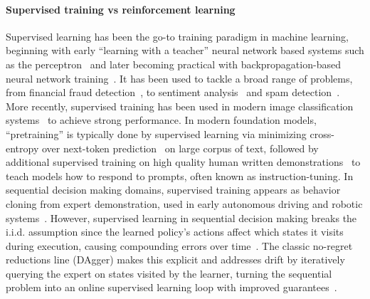 \documentclass[10pt]{article} %
\begin{document}
\paragraph{Supervised training vs reinforcement learning} Supervised learning has been the go-to training paradigm in machine learning, beginning with early ``learning with a teacher'' neural network based systems such as the perceptron~\citep{Rosenblatt1958ThePA} and later becoming practical with backpropagation-based neural network training~\citep{rumelhart1986learning}. It has been used to tackle a broad range of problems, from financial fraud detection~\citep{AFRIYIE2023100163,Editya_Alamin_Pramana_Kurniati_2025}, to sentiment analysis~\citep{zhang2018deeplearningsentimentanalysis} and spam detection~\citep{smsspamclassification,imagespamdetection}. More recently, supervised training has been used in modern image classification systems~\citep{lenet,alexnet} to achieve strong performance. In modern foundation models, ``pretraining'' is typically done by supervised learning via minimizing cross-entropy over next-token prediction~\citep{radford2018improving,radford2019language} on large corpus of text, followed by additional supervised training on high quality human written demonstrations~\citep{ouyang2022traininglanguagemodelsfollow,zhang2025instructiontuninglargelanguage} to teach models how to respond to prompts, often known as instruction-tuning. In sequential decision making domains, supervised training appears as behavior cloning from expert demonstration, used in early autonomous driving and robotic systems~\citep{alvinn,bojarski2016endendlearningselfdriving,codevilla2018endtoenddrivingconditionalimitation}. However, supervised learning in sequential decision making breaks the i.i.d. assumption since the learned policy's actions affect which states it visits during execution, causing compounding errors over time~\citep{efficientReductionsForImitationLearning,belkhale2023dataqualityimitationlearning}. The classic no-regret reductions line (DAgger) makes this explicit and addresses drift by iteratively querying the expert on states visited by the learner, turning the sequential problem into an online supervised learning loop with improved guarantees~\citep{ross2011reductionimitationlearningstructured}.
\end{document}
